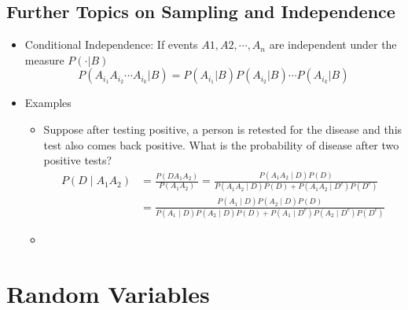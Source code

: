\documentclass{report}
\begin{document}
\section{Further Topics on Sampling and Independence}
  \begin{itemize}
    \item Conditional Independence: If events $A1,A2, \cdots , A_n$ are independent under the measure $P( \cdot | B)$
      \[ P(A_i_1 A_i_2 \cdots A_i_k | B) = P(A_i_1 | B) P(A_i_2 | B) \cdots P(A_i_k | B) \]
    \item Examples
      \begin{itemize}
        \item Suppose after testing positive, a person is retested for the disease
and this test also comes back positive. What is the probability of disease after two
positive tests?
        \[ \begin{aligned}
            P\left(D \mid A_1 A_2\right)
            & =\frac{P\left(D A_1 A_2\right)}{P\left(A_1 A_2\right)}
              =\frac{P\left(A_1 A_2 \mid D\right) P(D)}{P\left(A_1 A_2 \mid D\right)
                P(D)+P\left(A_1 A_2 \mid D^c\right) P\left(D^c\right)} \\
            & =\frac{P\left(A_1 \mid D\right) P\left(A_2 \mid D\right)
                P(D)}{P\left(A_1 \mid D\right) P\left(A_2 \mid D\right)
                P(D)+P\left(A_1 \mid D^c\right) P\left(A_2 \mid D^c\right) P\left(D^c\right)}
           \end{aligned} \]
        \item 
      \end{itemize}
  \end{itemize}


\chapter{Random Variables}
\end{document}
